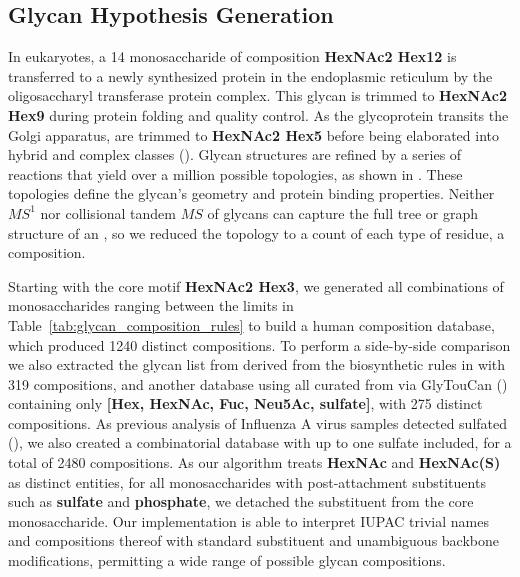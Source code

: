 \subsection{Glycan Hypothesis Generation}

    In eukaryotes, a 14 monosaccharide \nglycan of composition \textbf{HexNAc2 Hex12} is
    transferred to a newly synthesized protein in the endoplasmic reticulum by
    the oligosaccharyl transferase protein complex.  This glycan is trimmed to
    \textbf{HexNAc2 Hex9} during protein folding and quality control.  As the glycoprotein
    transits the Golgi apparatus, \nglycans are trimmed to \textbf{HexNAc2 Hex5} before
    being elaborated into hybrid and complex \nglycan classes (\cite{Stanley2009}).
    Glycan structures are refined by a series of reactions that yield over a million
    possible \nglycan topologies, as shown in \cite{Akune2016}. These topologies define
    the glycan's geometry and protein binding properties. Neither $MS^1$ nor collisional
    tandem $MS$ of glycans can capture the full tree or graph structure of an \nglycan,
    so we reduced the topology to a count of each type of residue, a composition.

    Starting with the core motif \textbf{HexNAc2 Hex3}, we generated all combinations of
    monosaccharides ranging between the limits in Table~\ref{tab:glycan_composition_rules}
    to build a human \nglycan composition database, which produced 1240 distinct compositions.
     \cite{Goldberg2009}
    To perform a side-by-side comparison we also extracted the glycan list from \cite{Yu2013}
    derived from the biosynthetic rules in \cite{Krambeck2005} with 319 compositions, and
    another database using all curated \nglycans from \glyspace via GlyTouCan (\cite{Tiemeyer2017})
    containing only \textbf{[Hex, HexNAc, Fuc, Neu5Ac, sulfate]}, with 275 distinct compositions. As
    previous analysis of Influenza A virus samples detected sulfated \nglycans (\cite{Khatri2016a}),
    we also created a combinatorial database with up to one sulfate included, for a total
    of 2480 compositions. As our algorithm treats \textbf{HexNAc} and \textbf{HexNAc(S)}
    as distinct entities, for all monosaccharides with post-attachment substituents such
    as \textbf{sulfate} and \textbf{phosphate}, we detached the substituent from the core
    monosaccharide. Our implementation is able to interpret IUPAC trivial names and compositions
    thereof with standard substituent and unambiguous backbone modifications, permitting a
    wide range of possible glycan compositions.

